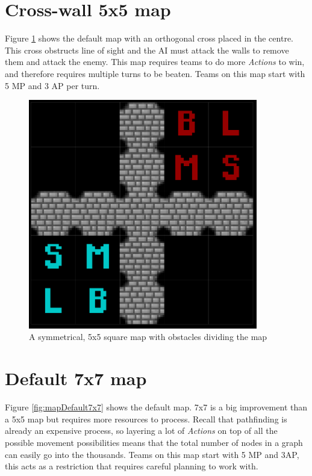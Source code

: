 \documentclass[11pt, a4paper]{report}
\begin{document}
\begin{appendices}
\pagebreak
\section{Cross-wall 5x5 map}
\label{sec:mapCrossWall5x5}

Figure \ref{fig:mapWithCrossWalls5x5} shows the default map with an orthogonal cross placed in the centre. This cross obstructs line of sight and the AI must attack the walls to remove them and attack the enemy. This map requires teams to do more \emph{Actions} to win, and therefore requires multiple turns to be beaten. Teams on this map start with 5 MP and 3 AP per turn.

\begin{figure}[!h]
  \centering
  \includegraphics[width=10cm]{img/map_cross_wall_5x5.png}
  \caption{A symmetrical, 5x5 square map with obstacles dividing the map}
  \label{fig:mapWithCrossWalls5x5}
\end{figure}

\pagebreak
\section{Default 7x7 map}
\label{sec:mapDefault7x7}

Figure \ref{fig:mapDefault7x7} shows the default map. 7x7 is a big improvement than a 5x5 map but requires more resources to process. Recall that pathfinding is already an expensive process, so layering a lot of \emph{Actions} on top of all the possible movement possibilities means that the total number of nodes in a graph can easily go into the thousands. Teams on this map start with 5 MP and 3AP, this acts as a restriction that requires careful planning to work with.


\end{appendices}
\end{document}
